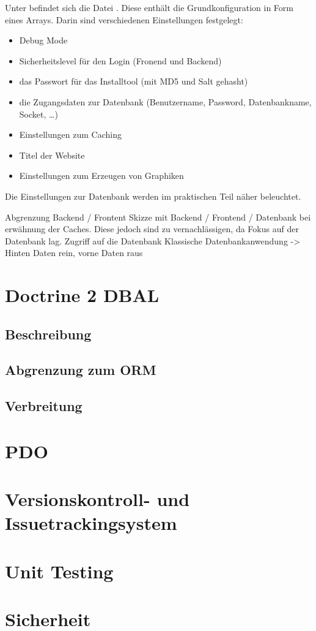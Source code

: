 Unter  befindet sich die Datei . Diese enthält die Grundkonfiguration in Form eines Arrays. Darin sind verschiedenen Einstellungen festgelegt:
\begin{itemize}
	\item Debug Mode
	\item Sicherheitslevel für den Login (Fronend und Backend)
	\item das Passwort für das Installtool (mit MD5 und Salt gehasht)
	\item die Zugangsdaten zur Datenbank (Benutzername, Password, Datenbankname, Socket, …)
	\item Einstellungen zum Caching
	\item Titel der Website
	\item Einstellungen zum Erzeugen von Graphiken
\end{itemize}

Die Einstellungen zur Datenbank werden im praktischen Teil näher beleuchtet.

		Abgrenzung Backend / Frontent
		Skizze mit Backend / Frontend / Datenbank bei erwähnung der Caches. Diese jedoch sind zu vernachlässigen, da
		Fokus auf der Datenbank lag.
		Zugriff auf die Datenbank
		Klassische Datenbankanwendung -> Hinten Daten rein, vorne Daten raus
\section{Doctrine 2 DBAL}
	\subsection{Beschreibung}
	\subsection{Abgrenzung zum ORM}
	\subsection{Verbreitung}
\section{PDO}
\section{Versionskontroll- und Issuetrackingsystem}

\section{Unit Testing}

\section{Sicherheit}
